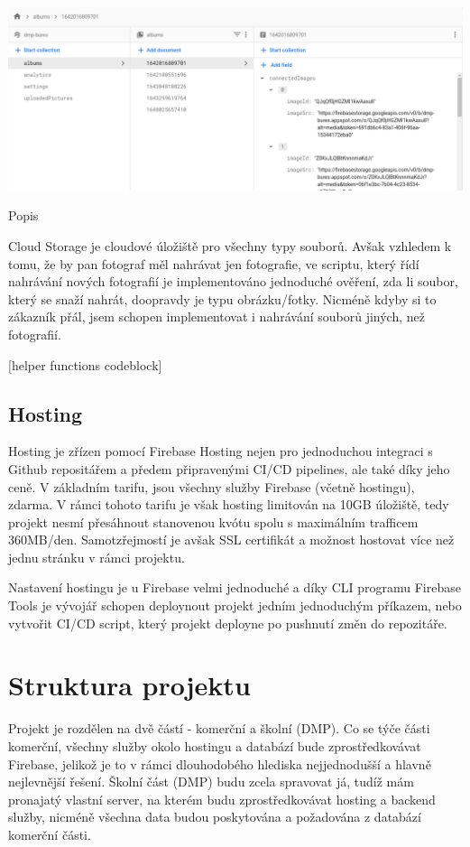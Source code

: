 \documentclass[12pt,a4paper]{report}
\begin{document}
  \vspace*{0.5cm}
  \noindent\includegraphics[width=\linewidth]{firestore.png}
  \begin{center}
    Popis
  \end{center}
  \vspace*{0.5cm}

  Cloud Storage je cloudové úložiště pro všechny typy souborů. Avšak vzhledem k tomu, že by pan
  fotograf měl nahrávat jen fotografie, ve scriptu, který řídí nahrávání nových fotografií je
  implementováno jednoduché ověření, zda li soubor, který se snaží nahrát, doopravdy je typu
  obrázku/fotky. Nicméně kdyby si to zákazník přál, jsem schopen implementovat i nahrávání
  souborů jiných, než fotografií.

  [helper functions codeblock]

  \section{Hosting}
  Hosting je zřízen pomocí Firebase Hosting nejen pro jednoduchou integraci s Github repositářem
  a předem připravenými CI/CD pipelines, ale také díky jeho ceně. V základním tarifu, jsou všechny služby
  Firebase (včetně hostingu), zdarma. V rámci tohoto tarifu je však hosting limitován na 10GB úložiště, tedy projekt 
  nesmí přesáhnout stanovenou kvótu spolu s maximálním trafficem 360MB/den. Samotzřejmostí je avšak SSL certifikát a možnost
  hostovat více než jednu stránku v rámci projektu.

  Nastavení hostingu je u Firebase velmi jednoduché a díky CLI programu Firebase Tools je vývojář schopen
  deploynout projekt jedním jednoduchým příkazem, nebo vytvořit CI/CD script, který projekt deployne po pushnutí změn do repozitáře. 

  \chapter{Struktura projektu}
  Projekt je rozdělen na dvě částí - komerční a školní (DMP). Co se týče části komerční, všechny
  služby okolo hostingu a databází bude zprostředkovávat Firebase, jelikož je to v rámci
  dlouhodobého hlediska nejjednodušší a hlavně nejlevnější řešení. Školní část (DMP) budu zcela
  spravovat já, tudíž mám pronajatý vlastní server, na kterém budu zprostředkovávat hosting a
  backend služby, nicméně všechna data budou poskytována a požadována z databází komerční
  části.
 
\end{document}
